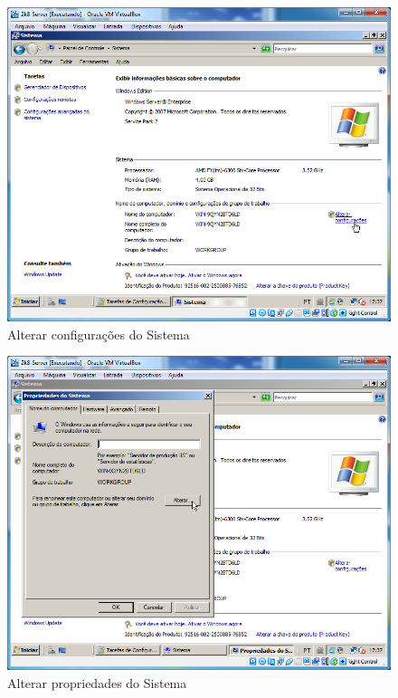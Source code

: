 \documentclass[10pt]{article}
\begin{document}
\begin{figure}[H]
    \centering
    \caption{Alterar configurações do Sistema}
    \label{fig:4222}
    \includegraphics[width=\linewidth]{images/configuracao_windows/windows_server/009.png}
\end{figure}
\begin{figure}[H]
    \centering
    \caption{Alterar propriedades do Sistema}
    \label{fig:4223}
    \includegraphics[width=\linewidth]{images/configuracao_windows/windows_server/010.png}
\end{figure}
\end{document}
